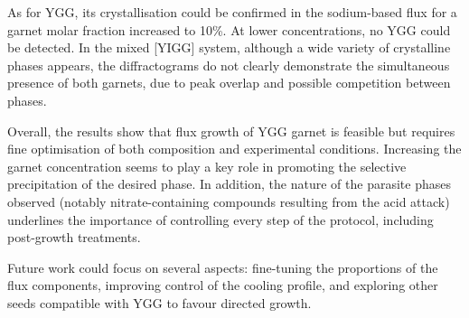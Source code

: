 \documentclass{rapportENSCP}
\begin{document}
As for YGG, its crystallisation could be confirmed in the sodium-based flux for a garnet molar fraction increased to 10\%. At lower concentrations, no YGG could be detected. In the mixed [YIGG] system, although a wide variety of crystalline phases appears, the diffractograms do not clearly demonstrate the simultaneous presence of both garnets, due to peak overlap and possible competition between phases.

Overall, the results show that flux growth of YGG garnet is feasible but requires fine optimisation of both composition and experimental conditions. Increasing the garnet concentration seems to play a key role in promoting the selective precipitation of the desired phase. In addition, the nature of the parasite phases observed (notably nitrate-containing compounds resulting from the acid attack) underlines the importance of controlling every step of the protocol, including post-growth treatments.

Future work could focus on several aspects: fine-tuning the proportions of the flux components, improving control of the cooling profile, and exploring other seeds compatible with YGG to favour directed growth.
\end{document}

